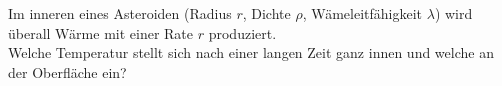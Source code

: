 \begin{Exercise}[label = Asteroidentemperatur, origin =Auswahlwettbewerb zur IPHO, title = Asteroidentemperatur ,difficulty = 3]
Im inneren eines Asteroiden (Radius $r$, Dichte $\rho$, Wämeleitfähigkeit $\lambda$) wird überall Wärme mit einer Rate $r$ produziert.\\
Welche Temperatur stellt sich nach einer langen Zeit ganz innen und welche an der Oberfläche ein?   	
\end{Exercise}
